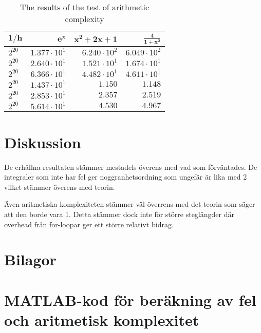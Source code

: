 \documentclass[a4paper,titlepage]{article}
\begin{document}
\begin{table}[h]
    \centering
    \begin{tabular}{l | r | r | r}
        $\mathbf{1/h}$ & $\mathbf{e^x}$         & $\mathbf{x^2 + 2x + 1}$ & $\mathbf{\frac{4}{1 + x^2}}$ \\ \hline
        $2^{20}$       & $ 1.377 \cdot 10^{1} $ & $ 6.240 \cdot 10^{2} $  & $ 6.049 \cdot 10^{2}       $ \\
        $2^{20}$       & $ 2.640 \cdot 10^{1} $ & $ 1.521 \cdot 10^{1} $  & $ 1.674 \cdot 10^{1}       $ \\
        $2^{20}$       & $ 6.366 \cdot 10^{1} $ & $ 4.482 \cdot 10^{1} $  & $ 4.611 \cdot 10^{1}       $ \\
        $2^{20}$       & $ 1.437 \cdot 10^{1} $ & $ 1.150              $  & $ 1.148                    $ \\
        $2^{20}$       & $ 2.853 \cdot 10^{1} $ & $ 2.357              $  & $ 2.519                    $ \\
        $2^{20}$       & $ 5.614 \cdot 10^{1} $ & $ 4.530              $  & $ 4.967                    $ \\

    \end{tabular}
    \caption{The results of the test of arithmetic complexity}
\end{table}


\section{Diskussion}

De erhållna resultaten stämmer mestadels överens med vad som förväntades. De integraler
som inte har fel ger noggranhetsordning som ungefär är lika med 2 vilket stämmer överens
med teorin.

Även aritmetiska komplexiteten stämmer väl överrens med det teorin som säger att
den borde vara 1. Detta stämmer dock inte för större steglängder där overhead från
for-loopar ger ett större relativt bidrag.


\section*{Bilagor}
\appendix

\section{MATLAB-kod för beräkning av fel och aritmetisk komplexitet}
\label{sec:testcode}

\end{document}
